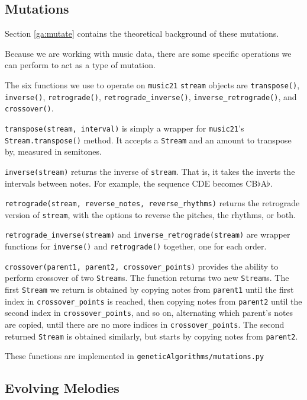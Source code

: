 \subsection{Mutations} \label{software:ga:mutations}

Section \ref{ga:mutate} contains the theoretical background of these mutations.

Because we are working with music data, there are some specific operations we can perform to act as a type of mutation.

The six functions we use to operate on \texttt{music21} \texttt{stream} objects are \texttt{transpose()}, \texttt{inverse()}, \texttt{retrograde()}, \texttt{retrograde\_inverse()}, \texttt{inverse\_retrograde()}, and \texttt{crossover()}.

\texttt{transpose(stream, interval)} is simply a wrapper for \texttt{music21}'s \texttt{Stream.transpose()} method.
It accepts a \texttt{Stream} and an amount to transpose by, measured in semitones.

\texttt{inverse(stream)} returns the inverse of \texttt{stream}.
That is, it takes the inverts the intervals between notes.
For example, the sequence CDE becomes CB$\flat$A$\flat$.

\texttt{retrograde(stream, reverse\_notes, reverse\_rhythms)} returns the retrograde version of \texttt{stream}, with the options to reverse the pitches, the rhythms, or both.

\texttt{retrograde\_inverse(stream)} and \texttt{inverse\_retrograde(stream)} are wrapper functions for \texttt{inverse()} and \texttt{retrograde()} together, one for each order.

\texttt{crossover(parent1, parent2, crossover\_points)} provides the ability to perform crossover of two \texttt{Stream}s.
The function returns two new \texttt{Stream}s.
The first \texttt{Stream} we return is obtained by copying notes from \texttt{parent1} until the first index in \texttt{crossover\_points} is reached, then copying notes from \texttt{parent2} until the second index in \texttt{crossover\_points}, and so on, alternating which parent's notes are copied, until there are no more indices in \texttt{crossover\_points}.
The second returned \texttt{Stream} is obtained similarly, but starts by copying notes from \texttt{parent2}.

These functions are implemented in \texttt{geneticAlgorithms/mutations.py}

\subsection{Evolving Melodies} \label{software:ga:evolving}

